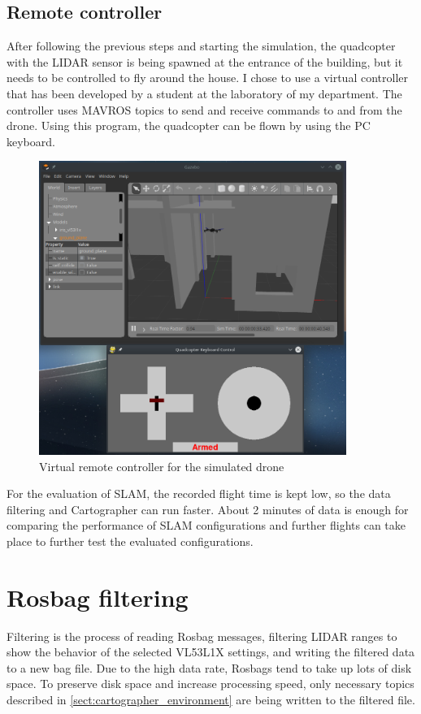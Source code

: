\subsection{Remote controller}
After following the previous steps and starting the simulation, the quadcopter with the LIDAR sensor
is being spawned at the entrance of the building, but it needs to be controlled to fly around the
house. I chose to use a virtual controller that has been developed by a student at the laboratory
of my department. The controller uses MAVROS topics to send and receive commands to and from the drone.
Using this program, the quadcopter can be flown by using the PC keyboard.

\begin{figure}[!ht]
    \centering
    \includegraphics[width=100mm, keepaspectratio]{figures/fly_with_controller.png}
    \caption{Virtual remote controller for the simulated drone}
    \label{fig:remote_controller}
\end{figure}

For the evaluation of SLAM, the recorded flight time is kept low, so the data filtering and Cartographer
can run faster. About 2 minutes of data is enough for comparing the performance of SLAM configurations
and further flights can take place to further test the evaluated configurations.

\section{Rosbag filtering}
Filtering is the process of reading Rosbag messages, filtering LIDAR ranges to show the behavior of the
selected VL53L1X settings, and writing the filtered data to a new bag file. Due to the high data rate,
Rosbags tend to take up lots of disk space. To preserve disk space and increase processing speed,
only necessary topics described in \ref{sect:cartographer_environment} are being written to the filtered file.

